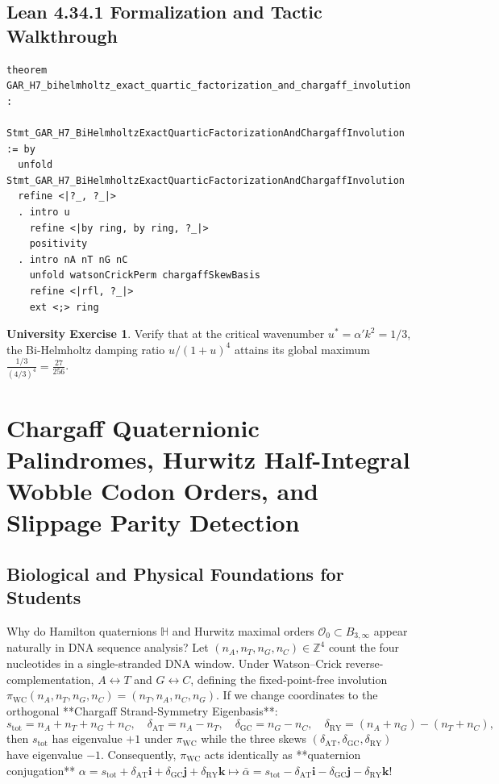 \documentclass[11pt,a4paper]{article}
\theoremstyle{definition}
\newtheorem{exercise}[theorem]{University Exercise}
\theoremstyle{remark}
\begin{document}
\subsection{Lean 4.34.1 Formalization and Tactic Walkthrough}
\begin{lstlisting}
theorem GAR_H7_bihelmholtz_exact_quartic_factorization_and_chargaff_involution :
    Stmt_GAR_H7_BiHelmholtzExactQuarticFactorizationAndChargaffInvolution := by
  unfold Stmt_GAR_H7_BiHelmholtzExactQuarticFactorizationAndChargaffInvolution
  refine <|?_, ?_|>
  . intro u
    refine <|by ring, by ring, ?_|>
    positivity
  . intro nA nT nG nC
    unfold watsonCrickPerm chargaffSkewBasis
    refine <|rfl, ?_|>
    ext <;> ring
\end{lstlisting}

\begin{exercise}
Verify that at the critical wavenumber $u^* = \alpha' k^2 = 1/3$, the Bi-Helmholtz damping ratio $u/(1+u)^4$ attains its global maximum $\frac{1/3}{(4/3)^4} = \frac{27}{256}$.
\end{exercise}

\section{Chargaff Quaternionic Palindromes, Hurwitz Half-Integral Wobble Codon Orders, and Slippage Parity Detection}

\subsection{Biological and Physical Foundations for Students}
Why do Hamilton quaternions $\mathbb{H}$ and Hurwitz maximal orders $\mathcal{O}_0 \subset B_{3,\infty}$ appear naturally in DNA sequence analysis? Let $(n_A, n_T, n_G, n_C) \in \mathbb{Z}^4$ count the four nucleotides in a single-stranded DNA window. Under Watson--Crick reverse-complementation, $A \leftrightarrow T$ and $G \leftrightarrow C$, defining the fixed-point-free involution $\pi_{\mathrm{WC}}(n_A, n_T, n_G, n_C) = (n_T, n_A, n_C, n_G)$. If we change coordinates to the orthogonal **Chargaff Strand-Symmetry Eigenbasis**:
\begin{equation}
  s_{\mathrm{tot}} = n_A + n_T + n_G + n_C, \quad \delta_{\mathrm{AT}} = n_A - n_T, \quad \delta_{\mathrm{GC}} = n_G - n_C, \quad \delta_{\mathrm{RY}} = (n_A + n_G) - (n_T + n_C),
\end{equation}
then $s_{\mathrm{tot}}$ has eigenvalue $+1$ under $\pi_{\mathrm{WC}}$ while the three skews $(\delta_{\mathrm{AT}}, \delta_{\mathrm{GC}}, \delta_{\mathrm{RY}})$ have eigenvalue $-1$. Consequently, $\pi_{\mathrm{WC}}$ acts identically as **quaternion conjugation** $\alpha = s_{\mathrm{tot}} + \delta_{\mathrm{AT}}\mathbf{i} + \delta_{\mathrm{GC}}\mathbf{j} + \delta_{\mathrm{RY}}\mathbf{k} \mapsto \bar{\alpha} = s_{\mathrm{tot}} - \delta_{\mathrm{AT}}\mathbf{i} - \delta_{\mathrm{GC}}\mathbf{j} - \delta_{\mathrm{RY}}\mathbf{k}$!
\end{document}
